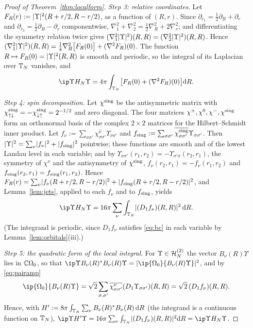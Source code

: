 \begin{proof}[Proof of Theorem~\ref{thm:localform}]
\emph{Step 3: relative coordinates.} Let $F_R(r):=\lvert\Upsilon\rvert^2(R+r/2,R-r/2)$, as a function of $(R,r)$. Since
$\partial_{r_1}=\frac12\partial_R+\partial_r$ and $\partial_{r_2}=\frac12\partial_R-\partial_r$ componentwise, $\nabla_1^2+\nabla_2^2=\frac12\nabla_R^2+2\nabla_r^2$;
and differentiating the symmetry relation twice gives $(\nabla_1^2\lvert\Upsilon\rvert^2)(R,R)=(\nabla_2^2\lvert\Upsilon\rvert^2)(R,R)$. Hence
$(\nabla_1^2\lvert\Upsilon\rvert^2)(R,R)=\frac14\nabla_R^2\bigl[F_R(0)\bigr]+(\nabla^2F_R)(0)$. The function
$R\mapsto F_R(0)=\lvert\Upsilon\rvert^2(R,R)$ is smooth and periodic, so the integral of its Laplacian over $\mathbb{T}_N$ vanishes,
and
\[
\ip\Upsilon{H_N\Upsilon}=4\pi\int_{\Tor_N}\bigl[F_R(0)+(\nabla^2F_R)(0)\bigr]\dd R .
\]

\emph{Step 4: spin decomposition.} Let $\chi^{\rm sing}$ be the antisymmetric matrix with
$\chi^{\rm sing}_{{\uparrow}{\downarrow}}=-\chi^{\rm sing}_{{\downarrow}{\uparrow}}=2^{-1/2}$ and zero diagonal. The four matrices $\chi^+,\chi^0,\chi^-,\chi^{\rm sing}$
form an orthonormal basis of the complex $2\times2$ matrices for the Hilbert--Schmidt inner product. Let $f_\nu:=\sum_{\sigma\sigma'}\overline{\chi^\nu_{\sigma\sigma'}}\Upsilon_{\sigma\sigma'}$
and $f_{\rm sing}:=\sum_{\sigma\sigma'}\overline{\chi^{\rm sing}_{\sigma\sigma'}}\Upsilon_{\sigma\sigma'}$. Then
$\lvert\Upsilon\rvert^2=\sum_\nu\lvert f_\nu\rvert^2+\lvert f_{\rm sing}\rvert^2$ pointwise; these functions are smooth and of the lowest Landau
level in each variable; and by $\Upsilon_{\sigma\sigma'}(r_1,r_2)=-\Upsilon_{\sigma'\sigma}(r_2,r_1)$, the symmetry of $\chi^\nu$ and the
antisymmetry of $\chi^{\rm sing}$, $f_\nu(r_2,r_1)=-f_\nu(r_1,r_2)$ and $f_{\rm sing}(r_2,r_1)=f_{\rm sing}(r_1,r_2)$. Hence
$F_R(r)=\sum_\nu\lvert f_\nu(R+r/2,R-r/2)\rvert^2+\lvert f_{\rm sing}(R+r/2,R-r/2)\rvert^2$, and Lemma~\ref{lem:jets}, applied to each
$f_\nu$ and to $f_{\rm sing}$, yields
\[
\ip\Upsilon{H_N\Upsilon}=16\pi\sum_\nu\int_{\Tor_N}\abs{(D_1f_\nu)(R,R)}^2\,\dd R .
\]
(The integrand is periodic, since $D_1f_\nu$ satisfies \eqref{eq:bc} in each variable by Lemma~\ref{lem:orbitals}(iii).)

\emph{Step 5: the quadratic form of the local integral.} For $\Upsilon\in\mathcal{H}_N^{(2)}$ the vector $B_\nu(R)\Upsilon$ lies
in $\mathbb{C}\Omega_0$, so that $\ip\Upsilon{B_\nu(R)^*B_\nu(R)\Upsilon}=\abs{\ip{\Omega_0}{B_\nu(R)\Upsilon}}^2$, and by
\eqref{eq:pairamp}
\[
\ip{\Omega_0}{B_\nu(R)\Upsilon}=\sqrt2\sum_{\sigma,\sigma'}\overline{\chi^\nu_{\sigma\sigma'}}(D_1\Upsilon_{\sigma\sigma'})(R,R)=\sqrt2\,(D_1f_\nu)(R,R).
\]
Hence, with $H':=8\pi\int_{\mathbb{T}_N}\sum_\nu B_\nu(R)^*B_\nu(R)\,\mathrm{d} R$ (the integrand is a continuous function on $\mathbb{T}_N$),
$\ip\Upsilon{H'\Upsilon}=16\pi\sum_\nu\int_{\Tor_N}\abs{(D_1f_\nu)(R,R)}^2\dd R=\ip\Upsilon{H_N\Upsilon}$.


\end{proof}
